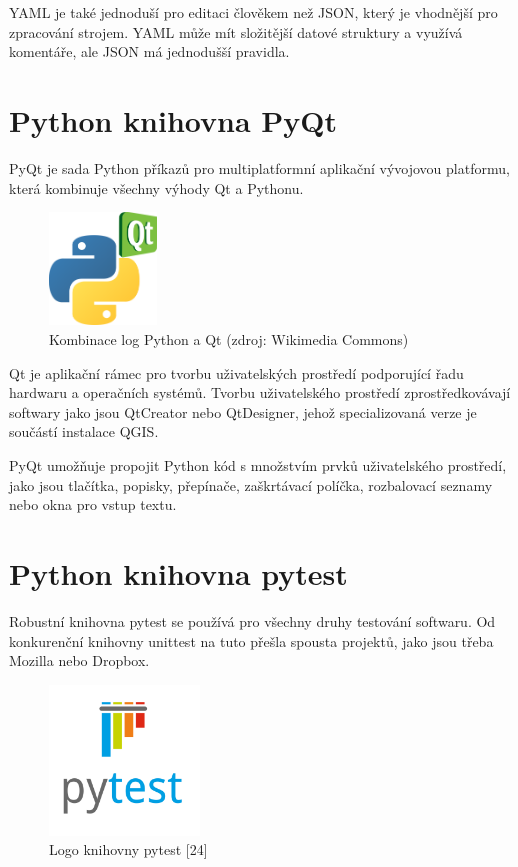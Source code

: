 \documentclass[a4paper,oneside,12pt]{book}
\begin{document}
\hspace{10mm}YAML je také jednoduší pro editaci člověkem než JSON, který je vhodnější pro zpracování strojem. YAML může mít složitější datové struktury a využívá komentáře, ale JSON má jednodušší pravidla. \cite{hsOq0virmVAO85Ud}


\section{Python knihovna PyQt} \label{pyqt}
\hspace{10mm}PyQt je sada Python příkazů pro multiplatformní aplikační vývojovou platformu, která kombinuje všechny výhody Qt a Pythonu.  \cite{Summerfield2007}

\begin{figure}[ht] \label{obr8}
\centering
\includegraphics[height=3cm]{pictures/Python_and_Qt.png}
\caption{Kombinace log Python a Qt  (zdroj: Wikimedia Commons)}
\label{fig:qt}
\end{figure}

\hspace{10mm}Qt je aplikační rámec pro tvorbu uživatelských prostředí podporující řadu hardwaru a operačních systémů. Tvorbu uživatelského prostředí zprostředkovávají softwary jako jsou QtCreator nebo QtDesigner, jehož specializovaná verze je součástí instalace QGIS.

\hspace{10mm}PyQt umožňuje propojit Python kód s množstvím prvků uživatelského prostředí, jako jsou tlačítka, popisky, přepínače, zaškrtávací políčka, rozbalovací seznamy nebo okna pro vstup textu.

\section{Python knihovna pytest} \label{pytest}
\hspace{10mm}Robustní knihovna pytest se používá pro všechny druhy testování softwaru. Od konkurenční knihovny unittest na tuto přešla spousta projektů, jako jsou třeba Mozilla nebo Dropbox. \cite{Okken2017}

\begin{figure}[ht] \label{obr9}
\centering
\includegraphics[height=4cm]{pictures/Pytest_logo.png}
\caption{Logo knihovny pytest [24]}
\label{fig:pytest}
\end{figure}
\end{document}
